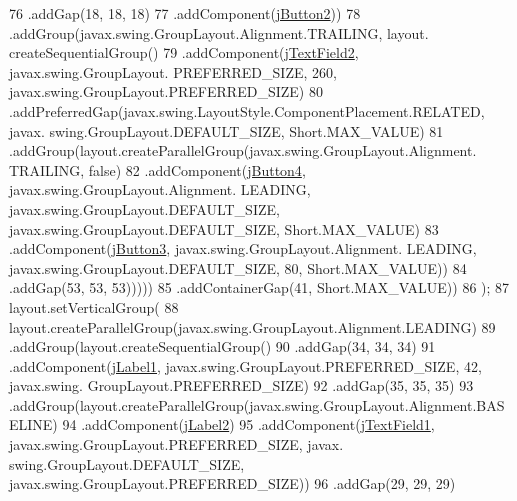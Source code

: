 \begin{DoxyCode}
76                                 .addGap(18, 18, 18)
77                                 .addComponent(\mbox{\hyperlink{classpa__sesion6_1_1_prog_principal_a124fb4257898d5e460eed588be9d285c}{jButton2}}))
78                             .addGroup(javax.swing.GroupLayout.Alignment.TRAILING, layout.
      createSequentialGroup()
79                                 .addComponent(\mbox{\hyperlink{classpa__sesion6_1_1_prog_principal_a0381b47538147a043d91431e3cb981dc}{jTextField2}}, javax.swing.GroupLayout.
      PREFERRED\_SIZE, 260, javax.swing.GroupLayout.PREFERRED\_SIZE)
80                                 .addPreferredGap(javax.swing.LayoutStyle.ComponentPlacement.RELATED, javax.
      swing.GroupLayout.DEFAULT\_SIZE, Short.MAX\_VALUE)
81                                 .addGroup(layout.createParallelGroup(javax.swing.GroupLayout.Alignment.
      TRAILING, \textcolor{keyword}{false})
82                                     .addComponent(\mbox{\hyperlink{classpa__sesion6_1_1_prog_principal_a9703d219be4d93bd1f6ed81cbfc1af61}{jButton4}}, javax.swing.GroupLayout.Alignment.
      LEADING, javax.swing.GroupLayout.DEFAULT\_SIZE, javax.swing.GroupLayout.DEFAULT\_SIZE, Short.MAX\_VALUE)
83                                     .addComponent(\mbox{\hyperlink{classpa__sesion6_1_1_prog_principal_ab47a77238e53b4e0e6d1d5cd5d83620d}{jButton3}}, javax.swing.GroupLayout.Alignment.
      LEADING, javax.swing.GroupLayout.DEFAULT\_SIZE, 80, Short.MAX\_VALUE))
84                                 .addGap(53, 53, 53)))))
85                 .addContainerGap(41, Short.MAX\_VALUE))
86         );
87         layout.setVerticalGroup(
88             layout.createParallelGroup(javax.swing.GroupLayout.Alignment.LEADING)
89             .addGroup(layout.createSequentialGroup()
90                 .addGap(34, 34, 34)
91                 .addComponent(\mbox{\hyperlink{classpa__sesion6_1_1_prog_principal_a52f639c7e833b4a261a9de20d1bb8e80}{jLabel1}}, javax.swing.GroupLayout.PREFERRED\_SIZE, 42, javax.swing.
      GroupLayout.PREFERRED\_SIZE)
92                 .addGap(35, 35, 35)
93                 .addGroup(layout.createParallelGroup(javax.swing.GroupLayout.Alignment.BASELINE)
94                     .addComponent(\mbox{\hyperlink{classpa__sesion6_1_1_prog_principal_a43bcbbe1661eb5a6c1cbc52e7f15ef96}{jLabel2}})
95                     .addComponent(\mbox{\hyperlink{classpa__sesion6_1_1_prog_principal_a1b336bc5700d2300c7c85f594b2a67c5}{jTextField1}}, javax.swing.GroupLayout.PREFERRED\_SIZE, javax.
      swing.GroupLayout.DEFAULT\_SIZE, javax.swing.GroupLayout.PREFERRED\_SIZE))
96                 .addGap(29, 29, 29)

\end{DoxyCode}
